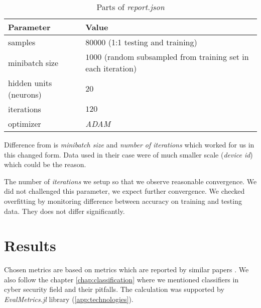 \begin{table}[h]
  \centering
  \caption{Parts of \emph{report.json}}
  \begin{tabular}{p{6cm}p{8cm}} 
      \toprule
      \textbf{Parameter} &
      \textbf{Value} \\
      \midrule
      samples & $80000$ (1:1 testing and training) \\
      \midrule
      minibatch size & $1000$ (random subsampled from training set in each iteration)\\
      \midrule
      hidden units (neurons)& $20$\\
      \midrule
      iterations & $120$\\
      \midrule
      optimizer & \emph{ADAM} \cite{Kingma2014}\\
      \bottomrule
  \end{tabular}
  \label{tab:hyperparams}
\end{table}


Difference from \cite{Mandlik2020} is \emph{minibatch size} and \emph{number of iterations} which worked for us in this changed form. Data used in their case were of much smaller scale (\emph{device id}) which could be the reason.

The number of \emph{iterations} we setup so that we observe reasonable convergence. We did not challenged this parameter, we expect further convergence. We checked overfitting by monitoring difference between accuracy on training and testing data. They does not differ significantly.

\section{Results}
Chosen metrics are based on metrics which are reported by similar papers . We also follow the chapter \ref{chap:classification} where we mentioned classifiers in cyber security field and their pitfalls. The calculation was supported by \emph{EvalMetrics.jl} library (\ref{app:technologies}).

